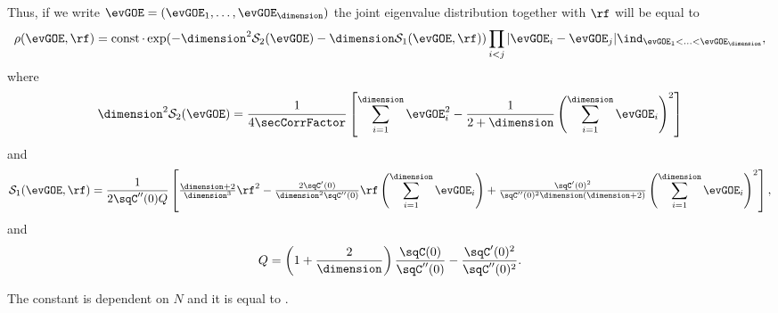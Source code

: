 Thus, if we write $\evGOE = (\evGOE_1, \ldots, \evGOE_\dimension)$ the joint eigenvalue distribution together with $\rf$ will be equal to 
\begin{align*}
    \rho(\evGOE,\rf) = \operatorname{const} \cdot \exp(- \dimension^2 \mathcal{S}_2(\evGOE) - \dimension \mathcal{S}_1 (\evGOE, \rf)) \prod_{i<j} |\evGOE_i - \evGOE_j| \ind_{\evGOE_1 < \ldots < \evGOE_\dimension},
\end{align*}
where
\begin{align*}
    \dimension^2 \mathcal{S}_2(\evGOE) = \frac{1}{4\secCorrFactor}  \left[ \sum_{i=1}^\dimension \evGOE_i^2 - \frac{1}{2+\dimension} \left(\sum_{i=1}^\dimension \evGOE_i \right)^2 \right]
\end{align*}
and
\begin{align*}
    \mathcal{S}_1(\evGOE, \rf) = \frac1{2\sqC''(0)Q}\left[
        \tfrac{\dimension+2}{\dimension^3}\rf^2
        - \tfrac{2\sqC'(0)}{\dimension^2\sqC''(0)}\rf\left(\sum_{i=1}^\dimension \evGOE_i \right)
        + \tfrac{\sqC'(0)^2}{\sqC''(0)^2\dimension(\dimension+2)}\left(\sum_{i=1}^\dimension \evGOE_i \right)^2
    \right],
\end{align*}
and
\[
	Q = \left(1+\frac2\dimension\right)
	\frac{\sqC(0)}{\sqC''(0)} - \frac{\sqC'(0)^2}{\sqC''(0)^2}.
\]

The constant is dependent on $N$ and it is equal to .